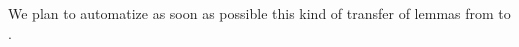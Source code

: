 
We plan to automatize as soon as possible this kind of transfer of lemmas from \gaia to \HydrasLib.















